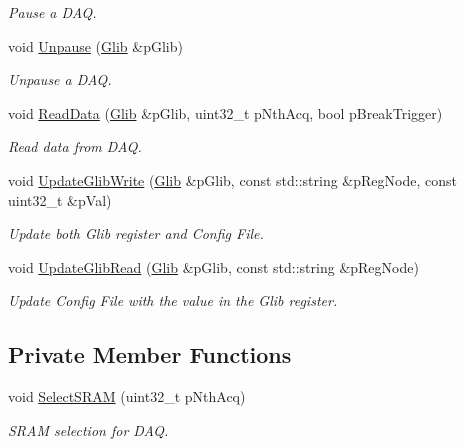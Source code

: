 \begin{DoxyCompactItemize}
\begin{DoxyCompactList}\small\item\em Pause a D\-A\-Q. \end{DoxyCompactList}\item 
void \hyperlink{class_ph2___hw_interface_1_1_glib_interface_a4d6568c22d8e3777ee909db37b3b01d6}{Unpause} (\hyperlink{class_ph2___hw_description_1_1_glib}{Glib} \&p\-Glib)
\begin{DoxyCompactList}\small\item\em Unpause a D\-A\-Q. \end{DoxyCompactList}\item 
void \hyperlink{class_ph2___hw_interface_1_1_glib_interface_ad3f91f03b0214987f4a9e8b63ff99dca}{Read\-Data} (\hyperlink{class_ph2___hw_description_1_1_glib}{Glib} \&p\-Glib, uint32\-\_\-t p\-Nth\-Acq, bool p\-Break\-Trigger)
\begin{DoxyCompactList}\small\item\em Read data from D\-A\-Q. \end{DoxyCompactList}\item 
void \hyperlink{class_ph2___hw_interface_1_1_glib_interface_afeda624fe12657712e9f10cd60603d8a}{Update\-Glib\-Write} (\hyperlink{class_ph2___hw_description_1_1_glib}{Glib} \&p\-Glib, const std\-::string \&p\-Reg\-Node, const uint32\-\_\-t \&p\-Val)
\begin{DoxyCompactList}\small\item\em Update both Glib register and Config File. \end{DoxyCompactList}\item 
void \hyperlink{class_ph2___hw_interface_1_1_glib_interface_a1ab42500cf3f6369a8eb2404ef8cd85b}{Update\-Glib\-Read} (\hyperlink{class_ph2___hw_description_1_1_glib}{Glib} \&p\-Glib, const std\-::string \&p\-Reg\-Node)
\begin{DoxyCompactList}\small\item\em Update Config File with the value in the Glib register. \end{DoxyCompactList}\end{DoxyCompactItemize}
\subsection*{Private Member Functions}
\begin{DoxyCompactItemize}
\item 
void \hyperlink{class_ph2___hw_interface_1_1_glib_interface_a014fc0ea74353469aa54e4eecaffb225}{Select\-S\-R\-A\-M} (uint32\-\_\-t p\-Nth\-Acq)
\begin{DoxyCompactList}\small\item\em S\-R\-A\-M selection for D\-A\-Q. \end{DoxyCompactList}\end{DoxyCompactItemize}
